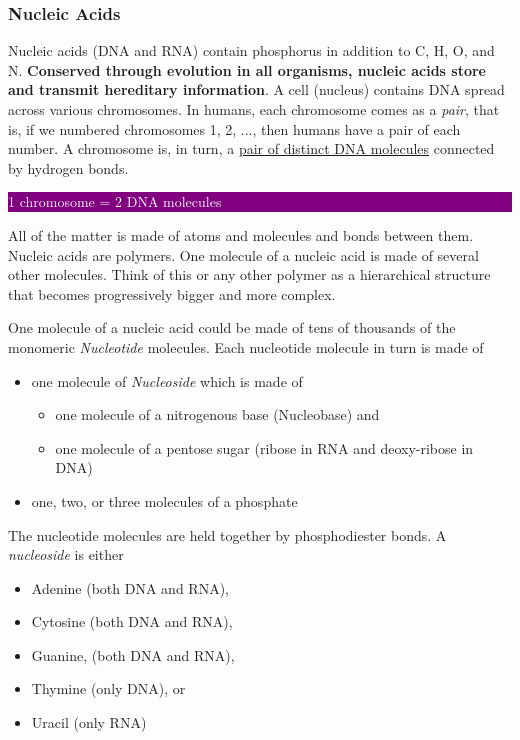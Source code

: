 \documentclass[12pt]{article}
\newcommand{\ctext}[3]{
    \colorbox{#2}{\parbox{0.9\textwidth}{\textcolor{#1}{#3}}}
}
\begin{document}
\subsubsection{Nucleic Acids}
Nucleic acids (DNA and RNA) contain phosphorus in addition to C, H, O, and N. \textbf{Conserved through evolution in all organisms, nucleic acids store and transmit hereditary information}. A cell (nucleus) contains DNA spread across various chromosomes. In humans, each chromosome comes as a \emph{pair}, that is, if we numbered chromosomes 1, 2, $\dots$, then humans have a pair of each number. A chromosome is, in turn, a \href{https://biology.stackexchange.com/a/996/63085}{pair of distinct DNA molecules} connected by hydrogen bonds.


\ctext{white}{purple}{
    1 chromosome = 2 DNA molecules
}

All of the matter is made of atoms and molecules and bonds between them. Nucleic acids are polymers. One molecule of a nucleic acid is made of several other molecules. Think of this or any other polymer as a hierarchical structure that becomes progressively bigger and more complex.

One molecule of a nucleic acid could be made of tens of thousands of the monomeric \emph{Nucleotide} molecules. Each nucleotide molecule in turn is made of 
\begin{itemize}
    \item one molecule of \emph{Nucleoside} which is made of
        \begin{itemize}
            \item one molecule of a nitrogenous base (Nucleobase) and
            \item one molecule of a pentose sugar (ribose in RNA and deoxy-ribose in DNA)
        \end{itemize}
    \item one, two, or three molecules of a phosphate 
\end{itemize}

The nucleotide molecules are held together by phosphodiester bonds. A \emph{nucleoside} is either
\begin{itemize}
    \item Adenine (both DNA and RNA),
    \item Cytosine (both DNA and RNA),
    \item Guanine, (both DNA and RNA),
    \item Thymine (only DNA), or
    \item Uracil (only RNA)
\end{itemize}
\end{document}
